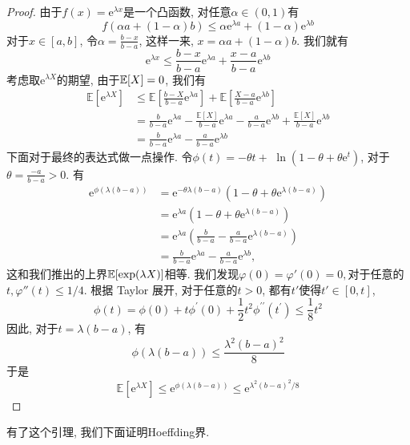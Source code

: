 \begin{proof}
    由于$f(x)=\mathrm{e}^{\lambda x}$是一个凸函数, 对任意$\alpha \in(0,1)$有
    $$
f(\alpha a+(1-\alpha) b) \leq \alpha \mathrm{e}^{\lambda a}+(1-\alpha) \mathrm{e}^{\lambda b}
$$
对于$x\in [a, b]$, 令$\alpha=\frac{b-x}{b-a}$, 这样一来, $x=\alpha a+(1-\alpha) b$. 我们就有
$$
\mathrm{e}^{\lambda x} \leq \frac{b-x}{b-a} \mathrm{e}^{\lambda a}+\frac{x-a}{b-a} \mathrm{e}^{\lambda b}
$$
考虑取$\mathrm{e}^{\lambda X}$的期望, 由于$\mathbb E[X]=0$, 我们有
$$
\begin{aligned}
\mathbb{E}\left[\mathrm{e}^{\lambda X}\right] & \leq \mathbb{E}\left[\frac{b-X}{b-a} \mathrm{e}^{\lambda a}\right]+\mathbb{E}\left[\frac{X-a}{b-a} \mathrm{e}^{\lambda b}\right] \\
& =\frac{b}{b-a} \mathrm{e}^{\lambda a}-\frac{\mathbb{E}[X]}{b-a} \mathrm{e}^{\lambda a}-\frac{a}{b-a} \mathrm{e}^{\lambda b}+\frac{\mathbb{E}[X]}{b-a} \mathrm{e}^{\lambda b} \\
& =\frac{b}{b-a} \mathrm{e}^{\lambda a}-\frac{a}{b-a} \mathrm{e}^{\lambda b}
\end{aligned}
$$
下面对于最终的表达式做一点操作. 令$\phi(t)=-\theta t+$ $\ln \left(1-\theta+\theta \mathrm{e}^t\right)$, 对于 $\theta=\frac{-a}{b-a}>0$. 有
$$
\begin{aligned}
\mathrm{e}^{\phi(\lambda(b-a))} & =\mathrm{e}^{-\theta \lambda(b-a)}\left(1-\theta+\theta \mathrm{e}^{\lambda(b-a)}\right) \\
& =\mathrm{e}^{\lambda a}\left(1-\theta+\theta \mathrm{e}^{\lambda(b-a)}\right) \\
& =\mathrm{e}^{\lambda a}\left(\frac{b}{b-a}-\frac{a}{b-a} \mathrm{e}^{\lambda(b-a)}\right) \\
& =\frac{b}{b-a} \mathrm{e}^{\lambda a}-\frac{a}{b-a} \mathrm{e}^{\lambda b},
\end{aligned}
$$
这和我们推出的上界$\mathbb E[\exp(\lambda X)]$相等. 我们发现$\varphi(0)=\varphi'(0)=0,$对于任意的$t, \varphi''(t)\leq 1/4$. 根据 Taylor 展开, 对于任意的$t>0$, 都有$t'$使得$t'\in [0,t]$, 
$$
\phi(t)=\phi(0)+t \phi^{\prime}(0)+\frac{1}{2} t^2 \phi^{\prime \prime}\left(t^{\prime}\right) \leq \frac{1}{8} t^2
$$
因此, 对于$t=\lambda (b-a)$, 有
$$
\phi(\lambda(b-a)) \leq \frac{\lambda^2(b-a)^2}{8}
$$
于是
$$
\mathbb{E}\left[\mathrm{e}^{\lambda X}\right] \leq \mathrm{e}^{\phi(\lambda(b-a))} \leq \mathrm{e}^{\lambda^2(b-a)^2 / 8}
$$
\end{proof}

有了这个引理, 我们下面证明Hoeffding界. 

